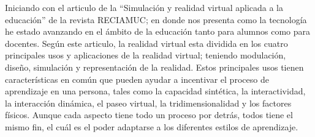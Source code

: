 Iniciando con el articulo de la “Simulación y realidad virtual aplicada a la educación” de la revista RECIAMUC; en donde nos presenta como la tecnología he estado avanzando en el ámbito de la educación tanto para alumnos como para docentes. Según este articulo, la realidad virtual esta dividida en los cuatro principales usos y aplicaciones de la realidad virtual; teniendo modulación, diseño, simulación y representación de la realidad. Estos principales usos tienen características en común que pueden ayudar a incentivar el proceso de aprendizaje en una persona, tales como la capacidad sintética, la interactividad, la interacción dinámica, el paseo virtual, la tridimensionalidad y los factores físicos. Aunque cada aspecto tiene todo un proceso por detrás, todos tiene el mismo fin, el cuál es el poder adaptarse a los diferentes estilos de aprendizaje. \parencite{rodriguez2021simulacion}
